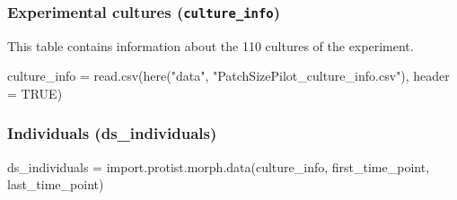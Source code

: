 \documentclass[
]{article}
\newenvironment{Shaded}{\begin{snugshade}}{\end{snugshade}}
\newcommand{\AttributeTok}[1]{\textcolor[rgb]{0.77,0.63,0.00}{#1}}
\newcommand{\ConstantTok}[1]{\textcolor[rgb]{0.00,0.00,0.00}{#1}}
\newcommand{\FunctionTok}[1]{\textcolor[rgb]{0.00,0.00,0.00}{#1}}
\newcommand{\NormalTok}[1]{#1}
\newcommand{\OtherTok}[1]{\textcolor[rgb]{0.56,0.35,0.01}{#1}}
\newcommand{\StringTok}[1]{\textcolor[rgb]{0.31,0.60,0.02}{#1}}
\begin{document}
\hypertarget{experimental-cultures-culture_info}{%
\subsubsection{\texorpdfstring{Experimental cultures
(\texttt{culture\_info})}{Experimental cultures (culture\_info)}}\label{experimental-cultures-culture_info}}

This table contains information about the 110 cultures of the
experiment.

\begin{Shaded}
\begin{Highlighting}[]
\NormalTok{culture\_info }\OtherTok{=} \FunctionTok{read.csv}\NormalTok{(}\FunctionTok{here}\NormalTok{(}\StringTok{"data"}\NormalTok{, }\StringTok{"PatchSizePilot\_culture\_info.csv"}\NormalTok{), }\AttributeTok{header =} \ConstantTok{TRUE}\NormalTok{)}
\end{Highlighting}
\end{Shaded}

\hypertarget{individuals-ds_individuals}{%
\subsubsection{Individuals
(ds\_individuals)}\label{individuals-ds_individuals}}

\begin{Shaded}
\begin{Highlighting}[]
\NormalTok{ds\_individuals }\OtherTok{=} \FunctionTok{import.protist.morph.data}\NormalTok{(culture\_info,}
\NormalTok{                                           first\_time\_point,}
\NormalTok{                                           last\_time\_point)}
\end{Highlighting}
\end{Shaded}
\end{document}
